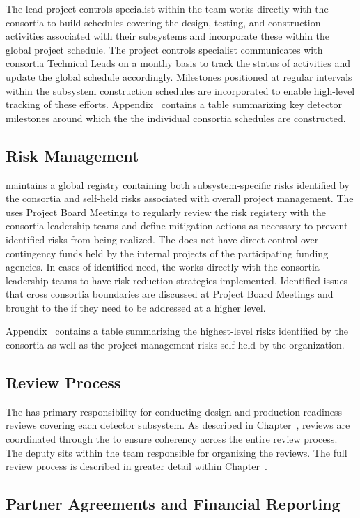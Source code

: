 The lead project controls specialist within the  team works
directly with the  consortia to build schedules covering
the design, testing, and construction activities associated with their
subsystems and incorporate these within the global project schedule.
The project controls specialist communicates with consortia Technical
Leads on a monthy basis to track the status of activities and update
the global schedule accordingly.  Milestones positioned at regular
intervals within the subsystem construction schedules are incorporated
to enable high-level tracking of these efforts.  Appendix~\label{appA}
contains a table summarizing key detector milestones around which the
the individual consortia schedules are constructed.

\subsection{Risk Management}

  maintains a global registry containing both
subsystem-specific risks identified by the consortia and self-held
risks associated with overall project management.  The 
uses Project Board Meetings to regularly review the risk registery
with the consortia leadership teams and define mitigation actions
as necessary to prevent identified risks from being realized.  The
 does not have direct control over contingency funds
held by the internal projects of the participating funding agencies.
In cases of identified need, the  works directly with
the consortia leadership teams to have risk reduction strategies
implemented.  Identified issues that cross consortia boundaries are
discussed at Project Board Meetings and brought to the 
 if they need to be addressed at a higher level.

Appendix~\label{appB} contains a table summarizing the highest-level
risks identified by the consortia as well as the project management
risks self-held by the  organization.


\subsection{Review Process}

The  has primary responsibility for conducting design
and production readiness reviews covering each detector subsystem.
As described in Chapter~\label{vl:tc-xxx}, reviews are coordinated
through the  to ensure coherency across the entire review
process.  The deputy  sits within the  team
responsible for organizing the reviews.  The full review process is
described in greater detail within Chapter~\label{vl:tc-yyy}.


\subsection{Partner Agreements and Financial Reporting}








